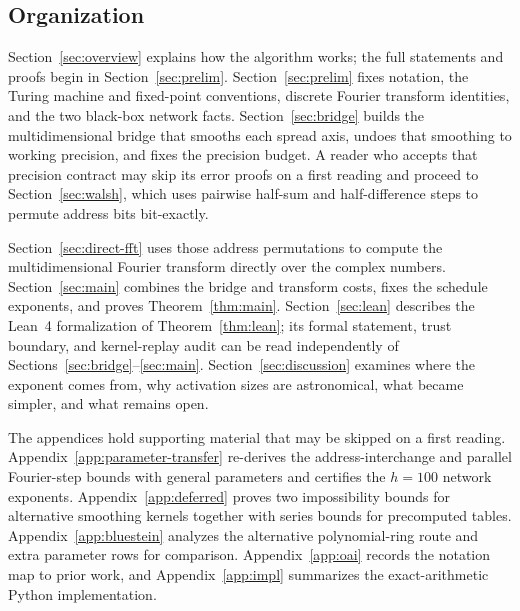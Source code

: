 \subsection{Organization}\label{sec:intro-roadmap}

Section~\ref{sec:overview} explains how the algorithm works; the full statements and proofs begin in Section~\ref{sec:prelim}. Section~\ref{sec:prelim} fixes notation, the Turing machine and fixed-point conventions, discrete Fourier transform identities, and the two black-box network facts. Section~\ref{sec:bridge} builds the multidimensional bridge that smooths each spread axis, undoes that smoothing to working precision, and fixes the precision budget. A reader who accepts that precision contract may skip its error proofs on a first reading and proceed to Section~\ref{sec:walsh}, which uses pairwise half-sum and half-difference steps to permute address bits bit-exactly.

Section~\ref{sec:direct-fft} uses those address permutations to compute the multidimensional Fourier transform directly over the complex numbers. Section~\ref{sec:main} combines the bridge and transform costs, fixes the schedule exponents, and proves Theorem~\ref{thm:main}. Section~\ref{sec:lean} describes the Lean~4 formalization of Theorem~\ref{thm:lean}; its formal statement, trust boundary, and kernel-replay audit can be read independently of Sections~\ref{sec:bridge}--\ref{sec:main}. Section~\ref{sec:discussion} examines where the exponent comes from, why activation sizes are astronomical, what became simpler, and what remains open.

The appendices hold supporting material that may be skipped on a first reading. Appendix~\ref{app:parameter-transfer} re-derives the address-interchange and parallel Fourier-step bounds with general parameters and certifies the $h=100$ network exponents. Appendix~\ref{app:deferred} proves two impossibility bounds for alternative smoothing kernels together with series bounds for precomputed tables. Appendix~\ref{app:bluestein} analyzes the alternative polynomial-ring route and extra parameter rows for comparison. Appendix~\ref{app:oai} records the notation map to prior work, and Appendix~\ref{app:impl} summarizes the exact-arithmetic Python implementation.
